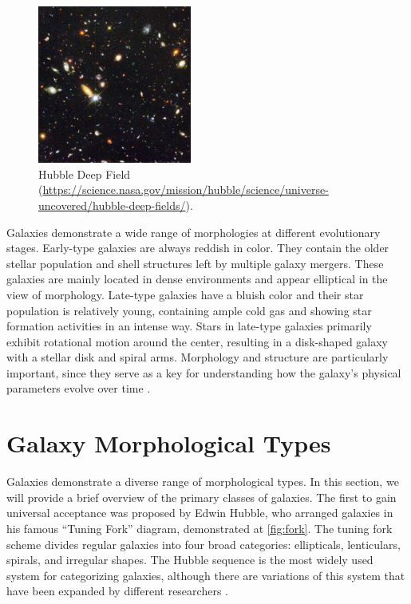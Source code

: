 \begin{figure}[htbp]
    \centering
    \includegraphics[width=0.45\textwidth]{obrazky-figures/02-theoretical-basis/deep-field.jpg}
    \caption{Hubble Deep Field (\url{https://science.nasa.gov/mission/hubble/science/universe-uncovered/hubble-deep-fields/}).}
    \label{fig:DeepFiled}
\end{figure}

Galaxies demonstrate a wide range of morphologies at different evolutionary stages. Early-type galaxies are always reddish in color. They contain the older stellar population and shell structures left by multiple galaxy mergers. These galaxies are mainly located in dense environments and appear elliptical in the view of morphology. Late-type galaxies have a bluish color and their star population is relatively young, containing ample cold gas and showing star formation activities in an intense way. Stars in late-type galaxies primarily exhibit rotational motion around the center, resulting in a disk-shaped galaxy with a stellar disk and spiral arms. Morphology and structure are particularly important, since they serve as a key for understanding how the galaxy’s physical parameters evolve over time \cite{van1998galaxy}.

\section{Galaxy Morphological Types}

Galaxies demonstrate a diverse range of morphological types. In this section, we will provide a brief overview of the primary classes of galaxies. The first to gain universal acceptance was proposed by Edwin Hubble, who arranged galaxies in his famous “Tuning Fork” diagram, demonstrated at \autoref{fig:fork}. The tuning fork scheme divides regular galaxies into four broad categories: ellipticals, lenticulars, spirals, and irregular shapes. The Hubble sequence is the most widely used system for categorizing galaxies, although there are variations of this system that have been expanded by different researchers \cite{Bonham2022Galaxies}.

